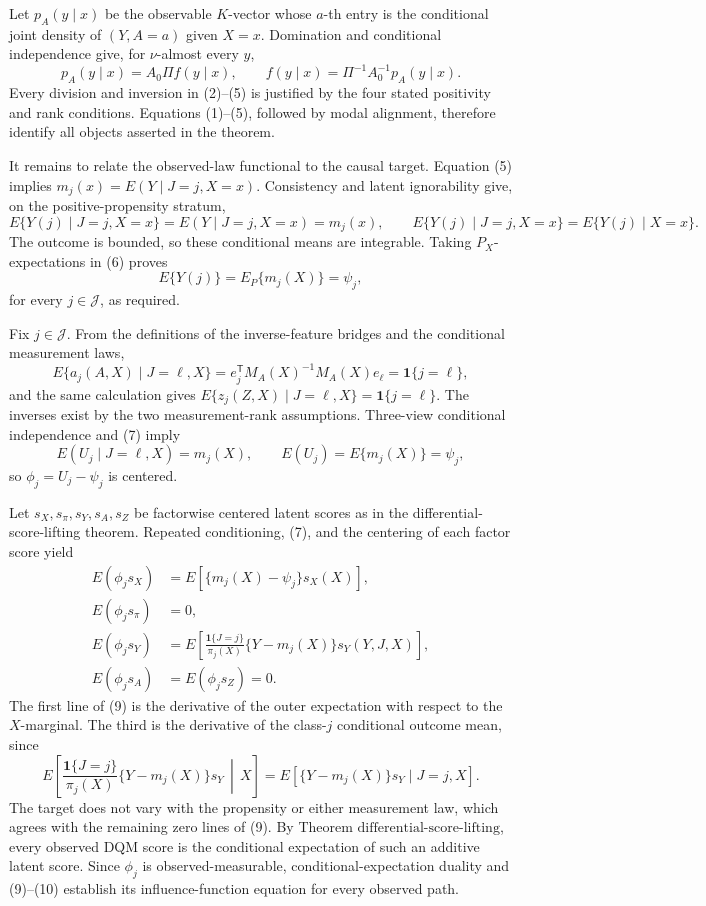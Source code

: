 Let \(p_A(y\mid x)\) be the observable \(K\)-vector whose \(a\)-th entry is the conditional joint density of \((Y,A=a)\) given \(X=x\).  Domination and conditional independence give, for \(\nu\)-almost every \(y\),
\[
p_A(y\mid x)=A_0\Pi f(y\mid x),\qquad
f(y\mid x)=\Pi^{-1}A_0^{-1}p_A(y\mid x). \tag{5}
\]
Every division and inversion in (2)--(5) is justified by the four stated positivity and rank conditions.  Equations (1)--(5), followed by modal alignment, therefore identify all objects asserted in the theorem.

It remains to relate the observed-law functional to the causal target.  Equation (5) implies
\(m_j(x)=E(Y\mid J=j,X=x)\).  Consistency and latent ignorability give, on the positive-propensity stratum,
\[
E\{Y(j)\mid J=j,X=x\}=E(Y\mid J=j,X=x)=m_j(x),
\qquad
E\{Y(j)\mid J=j,X=x\}=E\{Y(j)\mid X=x\}. \tag{6}
\]
The outcome is bounded, so these conditional means are integrable.  Taking \(P_X\)-expectations in (6) proves
\[
E\{Y(j)\}=E_P\{m_j(X)\}=\psi_j,
\]
for every \(j\in\mathcal J\), as required.

Fix \(j\in\mathcal J\).  From the definitions of the inverse-feature bridges and the conditional measurement laws,
\[
E\{a_j(A,X)\mid J=\ell,X\}
=e_j^{\mathsf T}M_A(X)^{-1}M_A(X)e_\ell
=\mathbf 1\{j=\ell\}, \tag{7}
\]
and the same calculation gives
\(E\{z_j(Z,X)\mid J=\ell,X\}=\mathbf 1\{j=\ell\}\).  The inverses exist by the two measurement-rank assumptions.  Three-view conditional independence and (7) imply
\[
E(U_j\mid J=\ell,X)=m_j(X),\qquad E(U_j)=E\{m_j(X)\}=\psi_j, \tag{8}
\]
so \(\phi_j=U_j-\psi_j\) is centered.

Let \(s_X,s_\pi,s_Y,s_A,s_Z\) be factorwise centered latent scores as in the differential-score-lifting theorem.  Repeated conditioning, (7), and the centering of each factor score yield
\[
\begin{aligned}
E(\phi_js_X)&=E[\{m_j(X)-\psi_j\}s_X(X)],\\
E(\phi_js_\pi)&=0,\\
E(\phi_js_Y)&=E\!\left[\frac{\mathbf 1\{J=j\}}{\pi_j(X)}
       \{Y-m_j(X)\}s_Y(Y,J,X)\right],\\
E(\phi_js_A)&=E(\phi_js_Z)=0.
\end{aligned} \tag{9}
\]
The first line of (9) is the derivative of the outer expectation with respect to the \(X\)-marginal.  The third is the derivative of the class-\(j\) conditional outcome mean, since
\[
E\!\left[\frac{\mathbf 1\{J=j\}}{\pi_j(X)}
 \{Y-m_j(X)\}s_Y\,\middle|\,X\right]
=E[\{Y-m_j(X)\}s_Y\mid J=j,X]. \tag{10}
\]
The target does not vary with the propensity or either measurement law, which agrees with the remaining zero lines of (9).  By Theorem \(\mathrm{differential\text{-}score\text{-}lifting}\), every observed DQM score is the conditional expectation of such an additive latent score.  Since \(\phi_j\) is observed-measurable, conditional-expectation duality and (9)--(10) establish its influence-function equation for every observed path.

